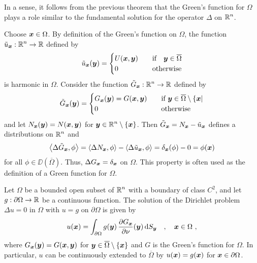 \begin{rmk}
In a sense, it follows from the previous theorem that the Green's
function for $\Omega$ plays a role similar to the fundamental solution
for the operator $\Delta$ on $\displaystyle \mathbb{R}^n$.
\label{GreenFunctAltDefn}

Choose ${\bm{x}}\in \Omega$.  By definition of the Green's function on
$\Omega$, the function
$\displaystyle \tilde{u}_{{\bm{x}}}: \mathbb{R}^n \rightarrow \mathbb{R}$ defined by
\[
\tilde{u}_{{\bm{x}}}({\bm{y}}) =
\begin{cases}
U({\bm{x}},{\bm{y}}) & \quad \text{if} \quad
{\bm{y}} \in \overline{\Omega} \\
0 & \quad \text{otherwise}
\end{cases}
\]
is harmonic in $\Omega$.  Consider the function
$\displaystyle \tilde{G}_{{\bm{x}}}: \mathbb{R}^n \rightarrow \mathbb{R}$ defined by
\[
\tilde{G}_{{\bm{x}}}({\bm{y}}) =
\begin{cases}
G_{{\bm{x}}}({\bm{y}}) = G({\bm{x}},{\bm{y}}) & \quad \text{if} \
{\bm{y}} \in \overline{\Omega} \setminus \{{\bm{x}}| \\
0 & \quad \text{otherwise}
\end{cases}
\]
and let $N_{{\bm{x}}}({\bm{y}}) = N({\bm{x}},{\bm{y}})$
for $\displaystyle {\bm{y}} \in \mathbb{R}^n\setminus \{{\bm{x}}\}$.
Then $\tilde{G}_{{\bm{x}}} = N_{{\bm{x}}} - \tilde{u}_{{\bm{x}}}$
defines a distributions on $\displaystyle \mathbb{R}^n$ and
\[
\left\langle{\Delta \tilde{G}_{{\bm{x}}}} , {\phi}\right\rangle = \left\langle{\Delta N_{{\bm{x}}}} , {\phi}\right\rangle
- \left\langle{\Delta \tilde{u}_{{\bm{x}}}} , {\phi}\right\rangle =
\delta_{{\bm{x}}}(\phi) - 0 = \phi({\bm{x}})
\]
for all $\phi \in \DD(\overline{\Omega})$.  Thus,
$\Delta G_{{\bm{x}}} = \delta_{{\bm{x}}}$ on $\Omega$.  This property is
often used as the definition of a Green function for $\Omega$.
\end{rmk}

\begin{theorem} \label{laplace_dirichlet2}
Let $\Omega$ be a bounded open subset of $\displaystyle \mathbb{R}^n$ with a
boundary of class $\displaystyle C^2$, and let
$g:\partial \Omega \rightarrow \mathbb{R}$ be a
continuous function.  The solution of the Dirichlet problem
$\Delta u = 0$ in $\Omega$ with $u=g$ on $\partial \Omega$ is given by
\[
u({\bm{x}}) = \int_{\partial \Omega} g({\bm{y}})\,
\frac{\partial{G_{{\bm{x}}}}}{\partial \nu}({\bm{y}})\,\mathrm{d}{S}_{{\bm{y}}}
\quad , \quad {\bm{x}} \in \Omega \  ,
\]
where $G_{{\bm{x}}}({\bm{y}}) = G({\bm{x}},{\bm{y}})$ for
${\bm{y}} \in \overline{\Omega} \setminus \{{\bm{x}}\}$ and $G$ is the
Green's function for $\Omega$.  In particular, $u$ can be continuously
extended to $\overline{\Omega}$ by $u({\bm{x}}) = g({\bm{x}})$ for
${\bm{x}} \in \partial \Omega$.
\end{theorem}

